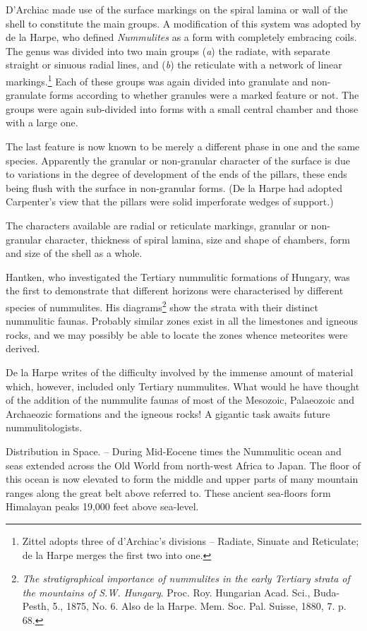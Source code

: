 \documentclass[a4paper, 12pt, oneside]{article}
\begin{document}
D'Archiac made use of the surface markings on the spiral lamina or wall of the shell to constitute the main groups. A modification of this system was adopted by de la Harpe, who defined \emph{Nummulites} as a form with completely embracing coils. The genus was divided into two main groups (\emph{a}) the radiate, with separate straight or sinuous radial lines, and (\emph{b}) the reticulate with a network of linear markings.\footnote{Zittel adopts three of d'Archiac's divisions -- Radiate, Sinuate and Reticulate; de la Harpe merges the first two into one.} Each of these groups was again divided into granulate and non-granulate forms according to whether granules were a marked feature or not. The groups were again sub-divided into forms with a small central chamber and those with a large one.

The last feature is now known to be merely a different phase in one and the same species. Apparently the granular or non-granular character of the surface is due to variations in the degree of development of the ends of the pillars, these ends being flush with the surface in non-granular forms. (De la Harpe had adopted Carpenter's view that the pillars were solid imperforate wedges of support.)

The characters available are radial or reticulate markings, granular or non-granular character, thickness of spiral lamina, size and shape of chambers, form and size of the shell as a whole.

Hantken, who investigated the Tertiary nummulitic formations of Hungary, was the first to demonstrate that different horizons were characterised by different species of nummulites. His diagrams\footnote{\emph{The stratigraphical importance of nummulites in the early Tertiary strata of the mountains of S.W. Hungary}. Proc. Roy. Hungarian Acad. Sci., Buda-Pesth, 5., 1875, No. 6. Also de la Harpe. Mem. Soc. Pal. Suisse, 1880, 7. p. 68.} show the strata with their distinct nummulitic faunas. Probably similar zones exist in all the limestones and igneous rocks, and we may possibly be able to locate the zones whence meteorites were derived.

De la Harpe writes of the difficulty involved by the immense amount of material which, however, included only Tertiary nummulites. What would he have thought of the addition of the nummulite faunas of most of the Mesozoic, Palaeozoic and Archaeozic formations and the igneous rocks! A gigantic task awaits future nummulitologists.

Distribution in Space. -- During Mid-Eocene times the Nummulitic ocean and seas extended across the Old World from north-west Africa to Japan. The floor of this ocean is now elevated to form the middle and upper parts of many mountain ranges along the great belt above referred to. These ancient sea-floors form Himalayan peaks 19,000 feet above sea-level.
\end{document}
